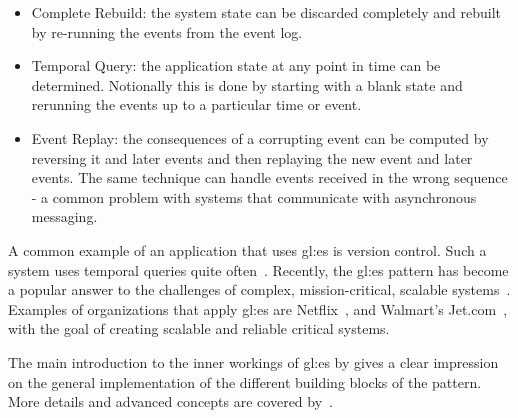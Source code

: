 \begin{itemize}
  \item Complete Rebuild: the system state can be discarded completely and rebuilt by re-running the events from the event log.
  \item Temporal Query: the application state at any point in time can be determined. Notionally this is done by starting with a blank state and rerunning the events up to a particular time or event.
  \item Event Replay: the consequences of a corrupting event can be computed by reversing it and later events and then replaying the new event and later events. The same technique can handle events received in the wrong sequence - a common problem with systems that communicate with asynchronous messaging.
\end{itemize}

A common example of an application that uses \gls{gl:es} is version control. Such a system uses temporal queries quite often~\citep{fowleres}. Recently, the \gls{gl:es} pattern has become a popular answer to the challenges of complex, mission-critical, scalable systems~\citep{OVEREEM2021110970}. Examples of organizations that apply \gls{gl:es} are Netflix~\citep{avery2017scaling}, and Walmart’s Jet.com~\citep{jet2017scaling}, with the goal of creating scalable and reliable critical systems.

The main introduction to the inner workings of \gls{gl:es} by \citep{fowleres} gives a clear impression on the general implementation of the different building blocks of the pattern. More details and advanced concepts are covered by~\citep{richardson2018microservices}.



